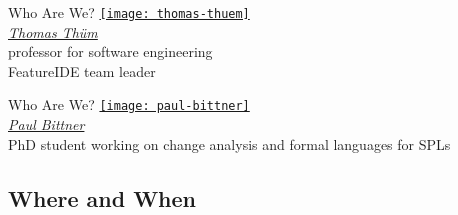 \begin{frame}{\myframetitle}
	\begin{fancycolumns}[animation=none]
		\begin{note}{Who Are We?}
			\centering
			\href{https://www.uni-ulm.de/en/in/sp/team/thuem/}{\texttt{[image: thomas-thuem]}}\\[.5ex]
			\href{https://www.uni-ulm.de/en/in/sp/team/thuem/}{\emph{Thomas Thüm}}\\[.5ex]
			\small professor for software engineering\\[.5ex]
			FeatureIDE team leader
		\end{note}
	\nextcolumn
		\begin{note}{Who Are We?}
		    \centering
		    \href{https://www.uni-ulm.de/en/in/sp/team/paul-maximilian-bittner/}{\texttt{[image: paul-bittner]}}\\[.5ex]
			\href{https://www.uni-ulm.de/en/in/sp/team/paul-maximilian-bittner/}{\emph{Paul Bittner}}\\[.5ex]
			\small PhD student working on change analysis and formal languages for SPLs\\[.5ex]
		\end{note}
	\end{fancycolumns}
\end{frame}

\subsection{Where and When}

